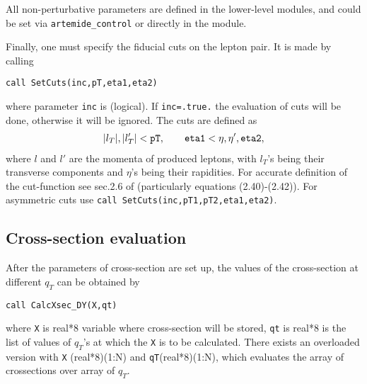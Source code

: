 \documentclass[prd,nofootinbib,eqsecnum,final]{revtex4}
\renewcommand{\(}{\left(}
\renewcommand{\)}{\right)}
\renewcommand{\[}{\left[}
\renewcommand{\]}{\right]}
\begin{document}
All non-perturbative parameters are defined in the lower-level modules, and could be set via \texttt{artemide\_control} or directly in the module.

Finally, one must specify the fiducial cuts on the lepton pair. It is made by calling

\texttt{call SetCuts(inc,pT,eta1,eta2)}

where parameter \texttt{inc} is (logical). If \texttt{inc=.true.} the evaluation of cuts will be done, otherwise it will be ignored. The cuts are defined as
\begin{eqnarray}
|l_T|,|l'_T|<\text{\texttt{pT}},\qquad \text{\texttt{eta1}}<\eta,\eta',\text{\texttt{eta2}},
\end{eqnarray}
where $l$ and $l'$ are the momenta of produced leptons, with $l_T$'s being their transverse components and $\eta$'s being their rapidities. For accurate definition of the cut-function see sec.2.6 of \cite{Scimemi:2017etj} (particularly equations (2.40)-(2.42)). For asymmetric cuts use \texttt{call SetCuts(inc,pT1,pT2,eta1,eta2)}.

\subsection{Cross-section evaluation}
\label{TMDX:xsec}

After the parameters of cross-section are set up, the values of the cross-section at different $q_T$ can be obtained by

\texttt{call CalcXsec\_DY(X,qt)}

where  \texttt{X} is real*8 variable where cross-section will be stored, \texttt{qt} is real*8 is the list of values of $q_T$'s at which the \texttt{X} is to be calculated. There exists an overloaded version with \texttt{X} (real*8)(1:N) and \texttt{qT}(real*8)(1:N), which evaluates the array of crossections over array of $q_T$.
\end{document}

